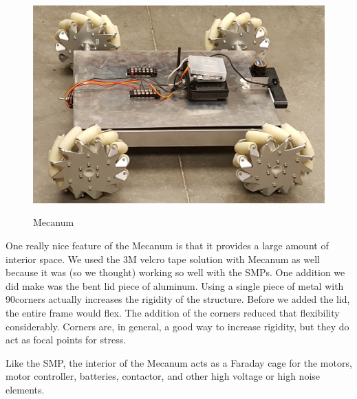 \begin{figure}[h]
\centering
\includegraphics[width=\textwidth]{mecanumrobot.png}
\label{fig:mecanum}
\caption{Mecanum}
\end{figure}

One really nice feature of the Mecanum is that it provides a large amount of interior space. We used the 3M velcro tape solution with Mecanum as well because it was (so we thought) working so well with the SMPs. One addition we did make was the bent lid piece of aluminum. Using a single piece of metal with 90\degree corners actually increases the rigidity of the structure. Before we added the lid, the entire frame would flex. The addition of the corners reduced that flexibility considerably. Corners are, in general, a good way to increase rigidity, but they do act as focal points for stress.

Like the SMP, the interior of the Mecanum acts as a Faraday cage for the motors, motor controller, batteries, contactor, and other high voltage or high noise elements.